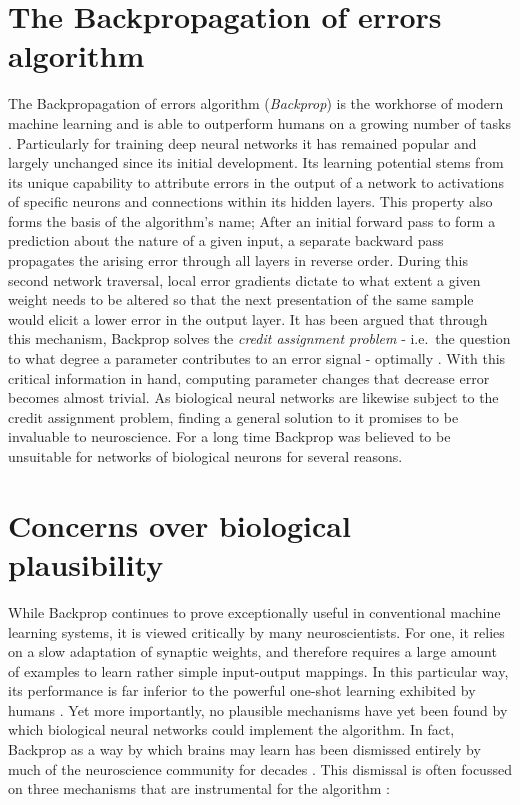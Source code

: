 \section{The Backpropagation of errors algorithm}

The Backpropagation of errors algorithm (\textit{Backprop}) \citep{Schmidhuber2014} is the workhorse of modern machine
learning and is able to outperform humans on a growing number of tasks \citep{LeCun2015}. Particularly for training deep
neural networks it has remained popular and largely unchanged since its initial development. Its learning potential
stems from its unique capability to attribute errors in the output of a network to activations of specific neurons and
connections within its hidden layers. This property also forms the basis of the algorithm's name; After an initial
forward pass to form a prediction about the nature of a given input, a separate backward pass propagates the arising
error through all layers in reverse order. During this second network traversal, local error gradients dictate to what
extent a given weight needs to be altered so that the next presentation of the same sample would elicit a lower error in
the output layer. It has been argued that through this mechanism, Backprop solves the \textit{credit assignment problem}
- i.e.\ the question to what degree a parameter contributes to an error signal - optimally \citep{Lillicrap2020}. With
this critical information in hand, computing parameter changes that decrease error becomes almost trivial. As biological
neural networks are likewise subject to the credit assignment problem, finding a general solution to it promises to be
invaluable to neuroscience. For a long time Backprop was believed to be unsuitable for networks of biological neurons
for several reasons.


\section{Concerns over biological plausibility}

While Backprop continues to prove exceptionally useful in conventional machine learning systems, it is viewed critically
by many neuroscientists. For one, it relies on a slow adaptation of synaptic weights, and therefore requires a large
amount of examples to learn rather simple input-output mappings. In this particular way, its performance is far inferior
to the powerful one-shot learning exhibited by humans \citep{Brea2016}. Yet more importantly, no plausible mechanisms
have yet been found by which biological neural networks could implement the algorithm. In fact, Backprop as a way by
which brains may learn has been dismissed entirely by much of the neuroscience community for decades
\citep{Grossberg1987,Crick1989,Mazzoni1991,OReilly1996}. This dismissal is often focussed on three mechanisms that are
instrumental for the algorithm \citep{whittington2019theories,Bengio2015,Liao2016}:



